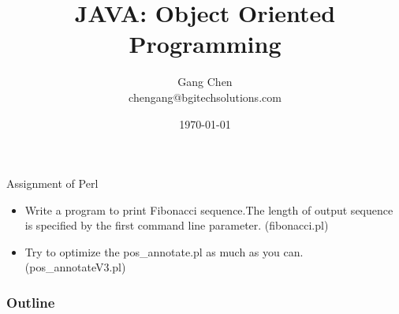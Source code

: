 \documentclass[UTF8]{beamer}
\title{JAVA: Object Oriented Programming}
\author{Gang Chen\\ chengang@bgitechsolutions.com}
\date{\today}
\begin{document}
\begin{frame}
\begin{block}{Assignment of Perl}
\begin{itemize}
\item Write a program to print Fibonacci sequence.The length of output sequence
is specified by the first command line parameter. (fibonacci.pl)
\item Try to optimize the pos_annotate.pl as much as you can. (pos_annotateV3.pl)
\end{itemize}
\end{block}
\end{frame}

\begin{frame}
\titlepage
\end{frame}
\begin{frame}[t]\frametitle{Outline}
\tableofcontents[hideallsubsections]
\end{frame}
\end{document}
